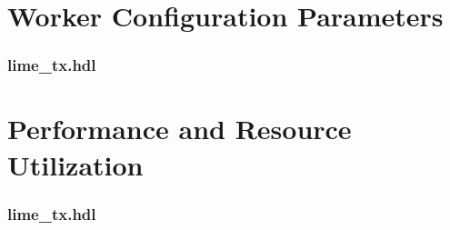 \documentclass{article}
\def\comp{lime\_tx}
\begin{document}
\begin{landscape}
\section*{Worker Configuration Parameters}
\subsubsection*{\comp.hdl}

\section*{Performance and Resource Utilization}
\subsubsection*{\comp.hdl}

\end{landscape}
\end{document}
